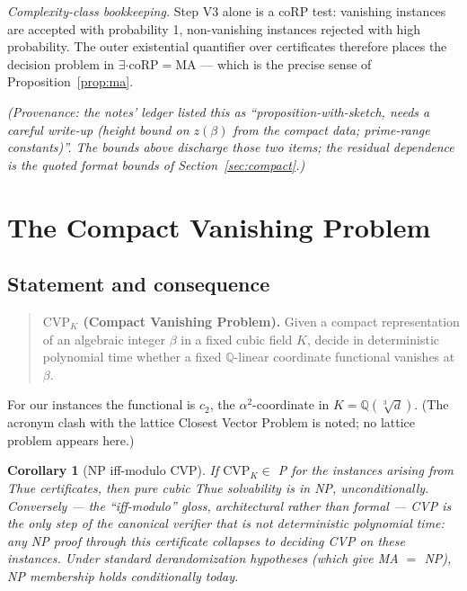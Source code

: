 \documentclass[11pt]{amsart}
\theoremstyle{plain}
\newtheorem{corollary}{Corollary}[section]
\theoremstyle{remark}
\begin{document}
\emph{Complexity-class bookkeeping.} Step V3 alone is a coRP test:
vanishing instances are accepted with probability 1, non-vanishing
instances rejected with high probability. The outer existential
quantifier over certificates therefore places the decision problem in
$\exists\cdot\mathrm{coRP} = \mathrm{MA}$ --- which is the precise
sense of Proposition~\ref{prop:ma}.

\emph{(Provenance: the notes' ledger listed this as
``proposition-with-sketch, needs a careful write-up (height bound on
$z(\beta)$ from the compact data; prime-range constants)''. The
bounds above discharge those two items; the residual dependence is
the quoted format bounds of Section~\ref{sec:compact}.)}

\section{The Compact Vanishing Problem}\label{sec:cvp}

\subsection{Statement and consequence}\label{sec:cvpstatement}

\begin{quote}
\textbf{$\mathrm{CVP}_K$ (Compact Vanishing Problem).} Given a
compact representation of an algebraic integer $\beta$ in a fixed
cubic field $K$, decide in deterministic polynomial time whether a
fixed $\mathbb{Q}$-linear coordinate functional vanishes at $\beta$.
\end{quote}

For our instances the functional is $c_2$, the $\alpha^2$-coordinate
in $K = \mathbb{Q}(\sqrt[3]{d})$. (The acronym clash with the lattice
Closest Vector Problem is noted; no lattice problem appears here.)

\begin{corollary}[NP iff-modulo CVP]\label{cor:npmodcvp}
If $\mathrm{CVP}_K \in$ \textup{P} for the instances arising from
Thue certificates, then pure cubic Thue solvability is in
\textup{NP}, unconditionally. Conversely --- the ``iff-modulo''
gloss, architectural rather than formal --- CVP is the \emph{only}
step of the canonical verifier that is not deterministic polynomial
time: any \textup{NP} proof through this certificate collapses to
deciding CVP on these instances. Under standard derandomization
hypotheses (which give \textup{MA} $=$ \textup{NP}), \textup{NP}
membership holds conditionally today.
\end{corollary}
\end{document}
